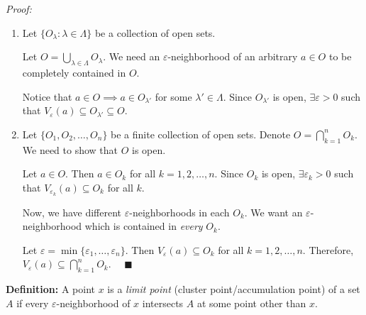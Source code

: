 \documentclass[12pt]{report}
\newcommand{\qed}{\quad \blacksquare}
\newcommand{\ep}{\varepsilon}
\newenvironment*{tbox}[2][gray]{
    \begin{tcolorbox}[
        parbox=false,
        colback=#1!5!white,
        colframe=#1!75!black,
        breakable,
        title={#2}
    ]}
    {\end{tcolorbox}}
\begin{document}
    \begin{tbox}{\textbf{Theorem:} 
        \begin{enumerate}
            \item The union of an arbitrary collection of open sets is open
            \item The intersection of a finite collection of open sets is open
        \end{enumerate}}
        \emph{Proof:} 
        \begin{enumerate}
            \item Let $\{O_{\lambda}: \lambda \in \Lambda\}$ be a collection of open sets. 
            
            Let $O = \bigcup_{\lambda \in \Lambda} O_{\lambda}$. We need an $\ep$-neighborhood of an arbitrary $a \in O$ to be completely contained in $O$. 

            Notice that $a \in O \implies a \in O_{\lambda'}$ for some $\lambda' \in \Lambda$. Since $O_{\lambda'}$ is open, $\exists \ep > 0$ such that $V_{\ep}(a) \subseteq O_{\lambda'} \subseteq O$. 

            \item Let $\{O_1, O_2, \dots, O_n\}$ be a finite collection of open sets. Denote $O = \bigcap_{k=1}^n O_k$. We need to show that $O$ is open.
            
            Let $a \in O$. Then $a \in O_k$ for all $k = 1, 2, \dots, n$. Since $O_k$ is open, $\exists \ep_k > 0$ such that $V_{\ep_k}(a) \subseteq O_k$ for all $k$. 

            Now, we have different $\ep$-neighborhoods in each $O_k$. We want an $\ep$-neighborhood which is contained in \emph{every} $O_k$. 

            Let $\ep = \min\{\ep_1, \dots, \ep_n\}$. Then $V_{\ep}(a) \subseteq O_k$ for all $k = 1, 2, \dots, n$. Therefore, $V_{\ep}(a) \subseteq \bigcap_{k=1}^n O_k$. $\qed$
        \end{enumerate}
    \end{tbox}

    \textbf{Definition:} A point $x$ is a \emph{limit point} (cluster point/accumulation point) of a set $A$ if every $\ep$-neighborhood of $x$ intersects $A$ at some point other than $x$. 
\end{document}
